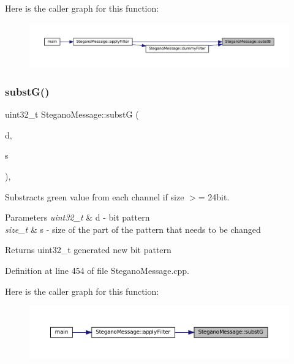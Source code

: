 Here is the caller graph for this function\+:
\nopagebreak
\begin{figure}[H]
\begin{center}
\leavevmode
\includegraphics[width=350pt]{classSteganoMessage_a7eb6fd157c777b2947603d018610ad0f_icgraph}
\end{center}
\end{figure}
\mbox{\label{classSteganoMessage_a4222a1b128b9b188c30ea99180f74111}} 
\subsubsection{\texorpdfstring{substG()}{substG()}}
{\footnotesize\ttfamily uint32\+\_\+t Stegano\+Message\+::substG (\begin{DoxyParamCaption}\item[{uint32\+\_\+t}]{d,  }\item[{size\+\_\+t}]{s }\end{DoxyParamCaption})\hspace{0.3cm}{\ttfamily [static]}, {\ttfamily [private]}}



Substracts green value from each channel if size $>$= 24bit. 


\begin{DoxyParams}{Parameters}
{\em uint32\+\_\+t} & d -\/ bit pattern \\
\hline
{\em size\+\_\+t} & s -\/ size of the part of the pattern that needs to be changed \\
\hline
\end{DoxyParams}
\begin{DoxyReturn}{Returns}
uint32\+\_\+t generated new bit pattern 
\end{DoxyReturn}


Definition at line 454 of file Stegano\+Message.\+cpp.

Here is the caller graph for this function\+:
\nopagebreak
\begin{figure}[H]
\begin{center}
\leavevmode
\includegraphics[width=350pt]{classSteganoMessage_a4222a1b128b9b188c30ea99180f74111_icgraph}
\end{center}
\end{figure}
\mbox{\label{classSteganoMessage_a021f0126410e739bc89ac2458198ad0c}} 

